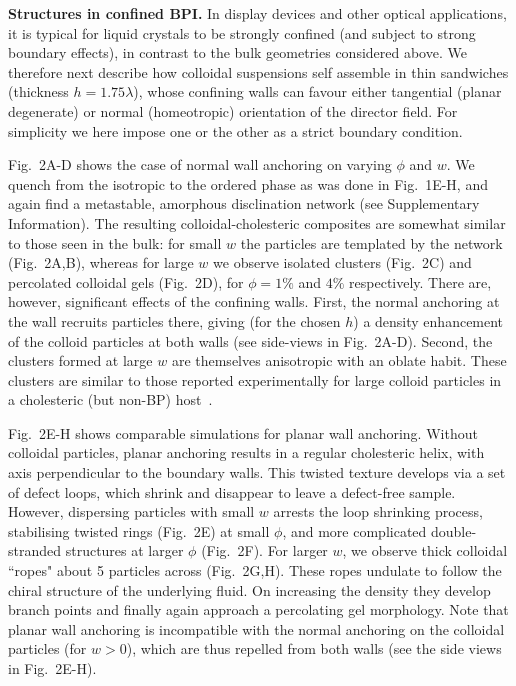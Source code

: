 \documentclass[12pt]{article}
\begin{document}
\medskip
\noindent
\textbf{Structures in confined BPI.}
In display devices and other optical applications, it is typical for liquid crystals to be strongly confined (and subject to strong boundary effects), in contrast to the bulk geometries considered above. We therefore next describe how colloidal suspensions self assemble in thin sandwiches (thickness $h = 1.75 \lambda$), whose confining walls can favour either tangential (planar degenerate) or normal (homeotropic) orientation of the director field. For simplicity we here impose one or the other as a strict boundary condition.

Fig.~2A-D shows the case of normal wall anchoring on varying $\phi$ and $w$. We quench from the isotropic to the ordered phase as was done in Fig.~1E-H, and again find a metastable, amorphous disclination network (see Supplementary Information). The resulting colloidal-cholesteric composites are somewhat similar to those seen in the bulk: for small $w$ the particles are templated by the network (Fig.~2A,B), whereas for large $w$ we observe isolated clusters (Fig.~2C) and percolated colloidal gels (Fig.~2D), for $\phi = 1\%$ and $4\%$ respectively. There are, however, significant effects of the confining walls.
First, the normal anchoring at the wall recruits particles there,  giving (for the chosen $h$) a density enhancement of the colloid particles at both walls 
(see side-views in Fig.~2A-D). Second, the clusters formed at large $w$ are themselves anisotropic with an oblate habit. These clusters
are similar to those reported experimentally for large colloid particles in a
cholesteric (but non-BP) host~\cite{niek}.
 
Fig.~2E-H shows comparable simulations for planar wall anchoring. 
Without colloidal particles, planar anchoring results in a regular
cholesteric helix,
with axis perpendicular to the boundary walls. 
This twisted texture develops via a set of defect loops,
which shrink and disappear to leave a defect-free sample. However,
dispersing particles with small $w$ arrests the loop shrinking process,
stabilising twisted rings (Fig.~2E) at small $\phi$, and more complicated 
double-stranded structures at larger $\phi$ (Fig.~2F).
For larger $w$, we observe thick colloidal ``ropes" about 5 particles across
(Fig.~2G,H). These ropes undulate to follow the chiral structure of the 
underlying fluid. On increasing the density they develop branch points and finally again approach a percolating gel morphology. Note that planar wall anchoring is incompatible with the normal anchoring on the colloidal particles (for $w>0$), which are thus repelled from both walls (see the side views in Fig.~2E-H).
\end{document}
